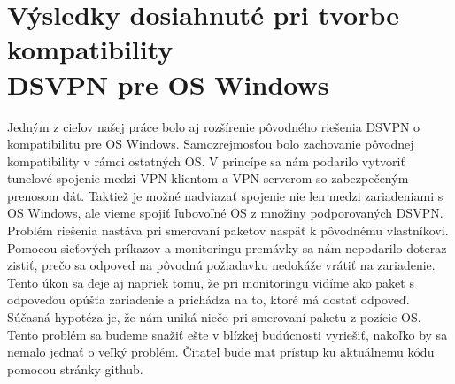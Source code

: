 \section{Výsledky dosiahnuté pri tvorbe kompatibility \\DSVPN pre OS Windows}
Jedným z cieľov našej práce bolo aj rozšírenie pôvodného riešenia DSVPN o kompatibilitu pre OS Windows. Samozrejmosťou bolo zachovanie pôvodnej kompatibility v rámci ostatných OS. V princípe sa nám podarilo vytvoriť tunelové spojenie medzi VPN klientom a VPN serverom so zabezpečeným prenosom dát. Taktiež je možné nadviazať spojenie nie len medzi zariadeniami s OS Windows, ale vieme spojiť ľubovoľné OS z množiny podporovaných DSVPN.  Problém riešenia nastáva pri smerovaní paketov naspäť k pôvodnému vlastníkovi. Pomocou sieťových príkazov a monitoringu premávky sa nám nepodarilo doteraz zistiť, prečo sa odpoveď na pôvodnú požiadavku nedokáže vrátiť na zariadenie. Tento úkon sa deje aj napriek tomu, že pri monitoringu vidíme ako paket s odpoveďou opúšťa zariadenie a prichádza na to, ktoré má dostať odpoveď. Súčasná hypotéza je, že nám uniká niečo pri smerovaní paketu z pozície OS. Tento problém sa budeme snažiť ešte v blízkej budúcnosti vyriešiť, nakoľko by sa nemalo jednať o veľký problém. Čitateľ bude mať prístup ku aktuálnemu kódu pomocou stránky github.   